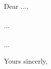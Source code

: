 \documentclass[en]{lettertemplate}
\begin{document}
    \makeheader

    \noindent
    Dear ...,

    \paragraph{}
        ...

    \paragraph{}
        ...

    \vskip 1cm

    \noindent
    Yours sincerly,

    \sign
\end{document}
